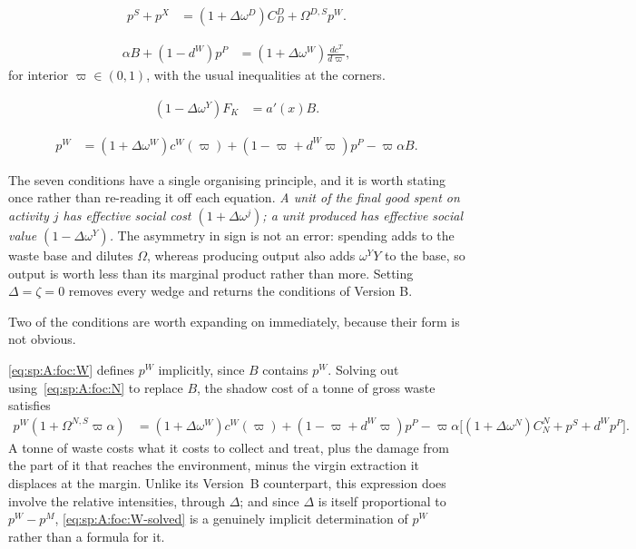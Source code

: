 \begin{align}
p^S+p^X &= \left(1+\Delta\omega^D\right)C^D_D+\Omega^{D,S}p^W .
\label{eq:sp:A:foc:D}
\end{align}

\begin{align}
\alpha B+\left(1-d^W\right)p^P &= \left(1+\Delta\omega^W\right)\frac{dc^T}{d\varpi},
\label{eq:sp:A:foc:varpi}
\end{align}
for interior $\varpi\in\left(0,1\right)$, with the usual inequalities at the corners.

\begin{align}
\left(1-\Delta\omega^Y\right)F_K &= a'\!\left(x\right)B.
\label{eq:sp:A:foc:KR}
\end{align}

\begin{align}
p^W &= \left(1+\Delta\omega^W\right)c^W\!\left(\varpi\right)
+\left(1-\varpi+d^W\varpi\right)p^P-\varpi\alpha B.
\label{eq:sp:A:foc:W}
\end{align}

 The seven conditions have a single organising principle, and it is worth
stating once rather than re-reading it off each equation. \emph{A unit of the final good spent on
activity $j$ has effective social cost $\left(1+\Delta\omega^j\right)$; a unit produced has effective
social value $\left(1-\Delta\omega^Y\right)$.} The asymmetry in sign is not an error: spending adds
to the waste base and dilutes $\Omega$, whereas producing output also adds $\omega^YY$ to the base,
so output is worth less than its marginal product rather than more. Setting $\Delta=\zeta=0$ removes
every wedge and returns the conditions of Version B.

Two of the conditions are worth expanding on immediately, because their form is not obvious.

\eqref{eq:sp:A:foc:W} defines $p^W$ implicitly, since $B$ contains $p^W$. Solving out
using~\eqref{eq:sp:A:foc:N} to replace $B$, the shadow cost of a tonne of gross waste
satisfies
\begin{align}
p^W\left(1+\Omega^{N,S}\varpi\alpha\right)
&= \left(1+\Delta\omega^W\right)c^W\!\left(\varpi\right)+\left(1-\varpi+d^W\varpi\right)p^P
-\varpi\alpha\Big[\left(1+\Delta\omega^N\right)C^N_N+p^S+d^Wp^P\Big].
\label{eq:sp:A:foc:W-solved}
\end{align}
A tonne of waste costs what it costs to collect and treat, plus the damage from the part of it that
reaches the environment, minus the virgin extraction it displaces at the margin. Unlike its Version~B
counterpart, this expression does involve the relative intensities, through $\Delta$; and since
$\Delta$ is itself proportional to $p^W-p^M$, \eqref{eq:sp:A:foc:W-solved} is a genuinely implicit
determination of $p^W$ rather than a formula for it.

